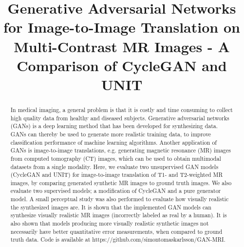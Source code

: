 \documentclass{article}
\title{Generative Adversarial Networks for Image-to-Image Translation on Multi-Contrast MR Images - A Comparison of CycleGAN and UNIT}
\begin{document}
%
\maketitle

\thispagestyle{plain}
\pagestyle{plain}

%
\begin{abstract}

In medical imaging, a general problem is that it is costly and time consuming to collect high quality data from healthy and diseased subjects. Generative adversarial networks (GANs) is a deep learning method that has been developed for synthesizing data. GANs can thereby be used to generate more realistic training data, to improve classification performance of machine learning algorithms. Another application of GANs is image-to-image translations, e.g. generating magnetic resonance (MR) images from computed tomography (CT) images, which can be used to obtain multimodal datasets from a single modality. Here, we evaluate two unsupervised GAN models (CycleGAN and UNIT) for image-to-image translation of T1- and T2-weighted MR images, by comparing generated synthetic MR images to ground truth images. We also evaluate two supervised models; a modification of CycleGAN and a pure generator model. A small perceptual study was also performed to evaluate how visually realistic the synthesized images are. It is shown that the implemented GAN models can synthesize visually realistic MR images (incorrectly labeled as real by a human). It is also shown that models producing more visually realistic synthetic images not necessarily have better quantitative error measurements, when compared to ground truth data. Code is available at https://github.com/simontomaskarlsson/GAN-MRI.

\end{abstract}
\end{document}
